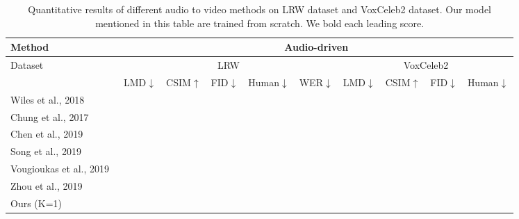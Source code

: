 \documentclass[runningheads]{llncs}
\begin{document}
 
\begin{table}[t]
\scriptsize
    \centering
\begin{tabular*}{\linewidth}{  l| c c c c c |c c c c}
      \toprule
      \hline
Method  & \multicolumn{9}{c}{Audio-driven}  \\ \hline
Dataset & \multicolumn{5}{c}{LRW} & \multicolumn{4}{c}{VoxCeleb2}  \\
& {LMD$\downarrow$} & {CSIM$\uparrow$} & {FID$\downarrow$} & {Human$\downarrow$} & {WER$\downarrow$} & {LMD$\downarrow$} & {CSIM$\uparrow$} & {FID$\downarrow$} & {Human$\downarrow$}  \\

\hline
{Wiles et al., 2018~\cite{wiles2018x2face}} &  &    &   & &    &    &  \\
 {Chung et al., 2017~\cite{chung2017you}}&  &       &  & &   &    &     \\ %

 {Chen et al., 2019~\cite{chen2019hierarchical}}  &   &   &   &  &   &   &  \\    %
  {Song et al., 2019~\cite{ijcai2019-129}}  & \textbf{ } &   &   & & \textbf{ }   &  &  \\    %
  {Vougioukas et al., 2019~\cite{vougioukas2019realistic}}  &   &   &   &  &     &        &  \\   

  {Zhou et al., 2019~\cite{zhou2019talking}}  &   &   &   &  &     &        &  \\   
  { Ours (K=1)} &   & \textbf{  }& \textbf{   }&  &   &\textbf{      } &\textbf{      }\\ %
  \end{tabular*}
  \caption{Quantitative results of different audio to video methods on LRW dataset and VoxCeleb2 dataset. Our model mentioned in this table are trained from scratch. We bold each leading score.}
    \label{tab:audio_tb}
\end{table}
\end{document}
